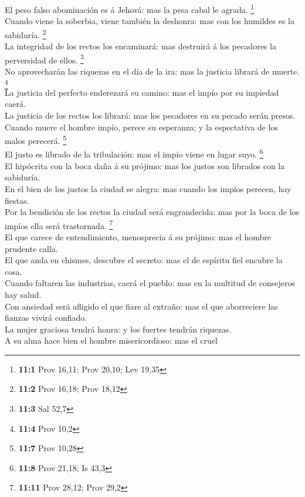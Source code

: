  El peso falso abominación es á Jehová: mas la pesa cabal le
agrada. \footnote{\textbf{11:1} Prov 16,11; Prov 20,10; Lev 19,35}\\
 Cuando viene la soberbia, viene también la deshonra: mas
con los humildes es la sabiduría. \footnote{\textbf{11:2} Prov 16,18;
  Prov 18,12}\\
 La integridad de los rectos los encaminará: mas destruirá á
los pecadores la perversidad de ellos. \footnote{\textbf{11:3} Sal 52,7}\\
 No aprovecharán las riquezas en el día de la ira: mas la
justicia librará de muerte. \footnote{\textbf{11:4} Prov 10,2}\\
 La justicia del perfecto enderezará su camino: mas el impío
por su impiedad caerá.\\
 La justicia de los rectos los librará: mas los pecadores en
su pecado serán presos.\\
 Cuando muere el hombre impío, perece su esperanza; y la
espectativa de los malos perecerá. \footnote{\textbf{11:7} Prov 10,28}\\
 El justo es librado de la tribulación: mas el impío viene
en lugar suyo. \footnote{\textbf{11:8} Prov 21,18; Is 43,3}\\
 El hipócrita con la boca daña á su prójimo: mas los justos
son librados con la sabiduría.\\
 En el bien de los justos la ciudad se alegra: mas cuando
los impíos perecen, hay fiestas.\\
 Por la bendición de los rectos la ciudad será
engrandecida: mas por la boca de los impíos ella será trastornada.
\footnote{\textbf{11:11} Prov 28,12; Prov 29,2}\\
 El que carece de entendimiento, menosprecia á su prójimo:
mas el hombre prudente calla.\\
 El que anda en chismes, descubre el secreto: mas el de
espíritu fiel encubre la cosa.\\
 Cuando faltaren las industrias, caerá el pueblo: mas en la
multitud de consejeros hay salud.\\
 Con ansiedad será afligido el que fiare al extraño: mas el
que aborreciere las fianzas vivirá confiado.\\
 La mujer graciosa tendrá honra: y los fuertes tendrán
riquezas.\\
 A su alma hace bien el hombre misericordioso: mas el cruel
